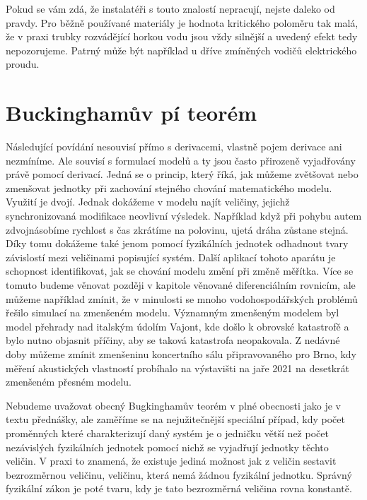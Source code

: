 \documentclass[12pt]{article}
\begin{document}
Pokud se vám zdá, že instalatéři s touto znalostí nepracují, nejste daleko od pravdy. Pro běžně používané materiály je hodnota kritického poloměru tak malá, že v praxi trubky rozvádějící horkou vodu jsou vždy silnější a uvedený efekt tedy nepozorujeme. Patrný může být například u dříve zmíněných vodičů elektrického proudu. 




\section*{Buckinghamův pí teorém}

Následující povídání nesouvisí přímo s derivacemi, vlastně pojem derivace ani nezmíníme. Ale souvisí s formulací modelů a ty jsou často přirozeně vyjadřovány právě pomocí derivací. Jedná se o princip, který říká, jak můžeme zvětšovat nebo zmenšovat jednotky při zachování stejného chování matematického modelu. Využití je dvojí. Jednak dokážeme v modelu najít veličiny, jejichž synchronizovaná modifikace neovlivní výsledek. Například když při pohybu autem zdvojnásobíme rychlost s čas zkrátíme na polovinu, ujetá dráha zůstane stejná. Díky tomu dokážeme také jenom pomocí fyzikálních jednotek odhadnout tvary závislostí mezi veličinami popisující systém. Další aplikací tohoto aparátu je schopnost identifikovat, jak se chování modelu změní při změně měřítka. Více se tomuto budeme věnovat později v kapitole věnované diferenciálním rovnicím, ale můžeme například zmínit, že v minulosti se mnoho vodohospodářských problémů řešilo simulací na zmenšeném modelu. Významným zmenšeným modelem byl model přehrady nad italským údolím Vajont, kde došlo k obrovské katastrofě a bylo nutno objasnit příčiny, aby se taková katastrofa neopakovala. Z nedávné doby můžeme zmínit zmenšeninu koncertního sálu připravovaného pro Brno, kdy měření akustických vlastností probíhalo na výstavišti na jaře 2021 na desetkrát zmenšeném přesném modelu.

Nebudeme uvažovat obecný Bugkinghamův teorém v plné obecnosti jako je v textu přednášky, ale zaměříme se na nejužitečnější speciální případ, kdy počet proměnných které charakterizují daný systém je o jedničku větší než počet nezávislých fyzikálních jednotek pomocí nichž se vyjadřují jednotky těchto veličin. V praxi to znamená, že existuje jediná možnost jak z veličin sestavit bezrozměrnou veličinu, veličinu, která nemá žádnou fyzikální jednotku. Správný fyzikální zákon je poté tvaru, kdy je tato bezrozměrná veličina rovna konstantě.
\end{document}
